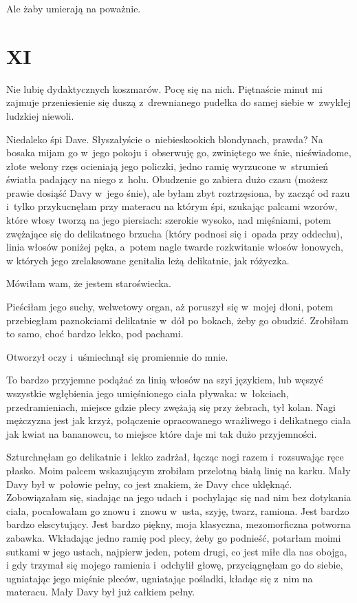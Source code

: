 \documentclass[oneside,polish,12pt,sfheadings]{mwbk}
\begin{document}
Ale żaby umierają na poważnie.

\chapter{XI}

Nie lubię dydaktycznych koszmarów. Pocę się na nich. Piętnaście minut
mi zajmuje przeniesienie się duszą z~drewnianego pudełka do samej
siebie w~zwykłej ludzkiej niewoli.

Niedaleko śpi Dave. Słyszałyście o~niebieskookich blondynach, prawda?
Na bosaka mijam go w~jego pokoju i~obserwuję go, zwiniętego we śnie,
nieświadome, złote welony rzęs ocieniają jego policzki, jedno ramię
wyrzucone w~strumień światła padający na niego z~holu. Obudzenie go
zabiera dużo czasu (możesz prawie dosiąść Davy w~jego śnie), ale byłam
zbyt roztrzęsiona, by zacząć od razu i~tylko przykucnęłam przy materacu
na którym śpi, szukając palcami wzorów, które włosy tworzą na jego
piersiach: szerokie wysoko, nad mięśniami, potem zwężające się do
delikatnego brzucha (który podnosi się i~opada przy oddechu), linia
włosów poniżej pęka, a~potem nagle twarde rozkwitanie włosów łonowych,
w których jego zrelaksowane genitalia leżą delikatnie, jak różyczka.

Mówiłam wam, że jestem staroświecka.

Pieściłam jego suchy, welwetowy organ, aż poruszył się w~mojej dłoni,
potem przebiegłam paznokciami delikatnie w~dół po bokach, żeby go
obudzić. Zrobiłam to samo, choć bardzo lekko, pod pachami.

Otworzył oczy i~uśmiechnął się promiennie do mnie.

To bardzo przyjemne podążać za linią włosów na szyi językiem, lub
węszyć wszystkie wgłębienia jego umięśnionego ciała pływaka: w~łokciach,
przedramieniach, miejsce gdzie plecy zwężają się przy żebrach, tył
kolan. Nagi mężczyzna jest jak krzyż, połączenie opracowanego wrażliwego
i delikatnego ciała jak kwiat na bananowcu, to miejsce które daje
mi tak dużo przyjemności.

Szturchnęłam go delikatnie i~lekko zadrżał, łącząc nogi razem i~rozsuwając
ręce płasko. Moim palcem wskazującym zrobiłam przelotną białą linię
na karku. Mały Davy był w~połowie pełny, co jest znakiem, że Davy
chce uklęknąć. Zobowiązałam się, siadając na jego udach i~pochylając
się nad nim bez dotykania ciała, pocałowałam go znowu i~znowu w~usta,
szyję, twarz, ramiona. Jest bardzo bardzo ekscytujący. Jest bardzo
piękny, moja klasyczna, mezomorficzna potworna zabawka. Wkładając
jedno ramię pod plecy, żeby go podnieść, potarłam moimi sutkami w
jego ustach, najpierw jeden, potem drugi, co jest miłe dla nas obojga,
i gdy trzymał się mojego ramienia i~odchylił głowę, przyciągnęłam
go do siebie, ugniatając jego mięśnie pleców, ugniatając pośladki,
kładąc się z~nim na materacu. Mały Davy był już całkiem pełny.
\end{document}
